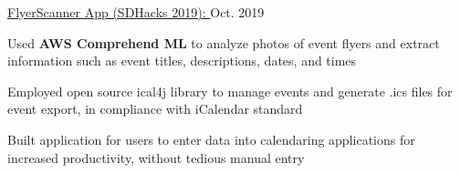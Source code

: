\begin{cventries}
  \cvproject
    {\href{https://github.com/hexalellogram/FlyerScanner}{FlyerScanner App (SDHacks 2019): }} %
    {Oct. 2019} %
    {
      \begin{cvitems} %
        \item {Used \textbf{AWS Comprehend ML} to analyze photos of event flyers and extract information such as event titles, descriptions, dates, and times}
        \item {Employed open source ical4j library to manage events and generate .ics files for event export, in compliance with iCalendar standard}
        \item {Built application for users to enter data into calendaring applications for increased productivity, without tedious manual entry}
      \end{cvitems}
    }

    
\end{cventries}